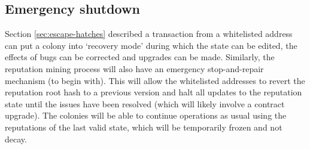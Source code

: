 \subsection{Emergency shutdown}\label{sec:big-red-button}
Section \ref{sec:escape-hatches} described a transaction from a whitelisted address can put a colony into `recovery mode' during which the state can be edited, the effects of bugs can be corrected and upgrades can be made. Similarly, the reputation mining process will also have an emergency stop-and-repair mechanism (to begin with). This will allow the whitelisted addresses to revert the reputation root hash to a previous version and halt all updates to the reputation state until the issues have been resolved (which will likely involve a contract upgrade). The colonies will be able to continue operations as usual using the reputations of the last valid state, which will be temporarily frozen and not decay.
